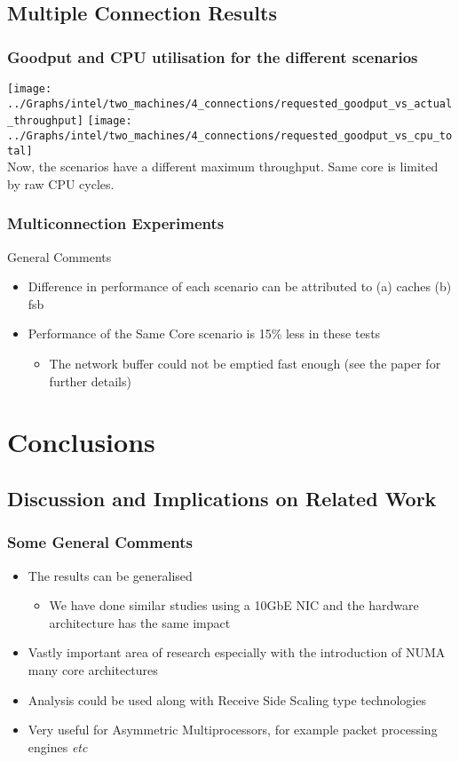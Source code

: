 \documentclass{beamer}
\begin{document}
\subsection[Using Multi-connection]{Multiple Connection Results}

\begin{frame}
	\frametitle{Goodput and CPU utilisation for the different scenarios}
		\texttt{[image: ../Graphs/intel/two\_machines/4\_connections/requested\_goodput\_vs\_actual\_throughput]}
		\texttt{[image: ../Graphs/intel/two\_machines/4\_connections/requested\_goodput\_vs\_cpu\_total]}
	\\Now, the scenarios have a different maximum throughput. Same core is limited by raw CPU cycles.
\end{frame}

\begin{frame}
	\frametitle{Multiconnection Experiments}
	General Comments
	\begin{itemize}
		\item Difference in performance of each scenario can be attributed to (a) caches (b) fsb
		\item Performance of the Same Core scenario is 15\% less in these tests
			\begin{itemize}
				\item The network buffer could not be emptied fast enough (see the paper for further details)
			\end{itemize}
	\end{itemize}
\end{frame}


\section{Conclusions}

\subsection[Discussions]{Discussion and Implications on Related Work}
\begin{frame}
	\frametitle{Some General Comments}
	\begin{itemize}
		\item The results can be generalised
			\begin{itemize}
				\item We have done similar studies using a 10GbE NIC and the hardware architecture has the same impact 
			\end{itemize}
		\item Vastly important area of research especially with the introduction of NUMA many core architectures
		\item Analysis could be used along with Receive Side Scaling type technologies
		\item Very useful for Asymmetric Multiprocessors, for example packet processing engines \textit{etc}

	\end{itemize}
\end{frame}
\end{document}
